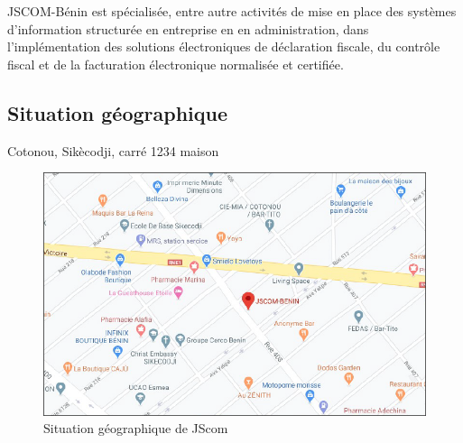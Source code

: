 \documentclass[a4paper,12pt,french]{report} %
\begin{document}
	JSCOM-Bénin est spécialisée, entre autre activités de mise en place des systèmes d'information structurée en entreprise en en administration, dans l'implémentation des solutions électroniques de déclaration fiscale, du contrôle fiscal et de la facturation électronique normalisée et certifiée.
		
	\subsection{Situation géographique}
		Cotonou, Sikècodji, carré 1234 maison
	\begin{figure}[H]
	\centering
	\includegraphics[scale=0.8]{figure/jscom-map.png}		
	\caption{Situation géographique de JScom}		
	\label{Situation géographique de JScom}
	\end{figure}
		
		
\end{document}
